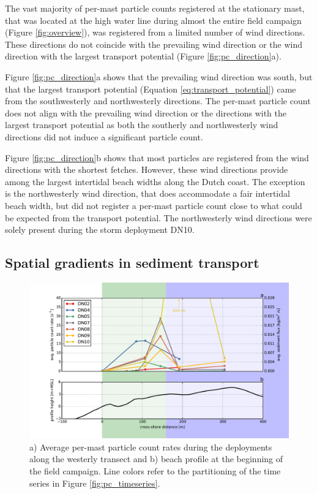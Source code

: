 The vast majority of per-mast particle counts registered at the
stationary mast, that was located at the high water line during almost
the entire field campaign (Figure \ref{fig:overview}), was registered
from a limited number of wind directions. These directions do not
coincide with the prevailing wind direction or the wind direction with
the largest transport potential (Figure \ref{fig:pc_direction}a).

Figure \ref{fig:pc_direction}a shows that the prevailing wind
direction was south, but that the largest transport potential
(Equation \ref{eq:transport_potential}) came from the southwesterly
and northwesterly directions. The per-mast particle count does not
align with the prevailing wind direction or the directions with the
largest transport potential as both the southerly and northwesterly
wind directions did not induce a significant particle count.

Figure \ref{fig:pc_direction}b shows that most particles are
registered from the wind directions with the shortest
fetches. However, these wind directions provide among the largest
intertidal beach widths along the Dutch coast.  The
exception is the northwesterly wind direction, that does accommodate a
fair intertidal beach width, but did not register a per-mast particle
count close to what could be expected from the transport
potential. The northwesterly wind directions were solely present
during the storm deployment DN10.

\subsection{Spatial gradients in sediment transport}

\begin{figure}
 \centering
  \includegraphics[width=\columnwidth]{../Figures/particlecounts_transects}
  \caption{a) Average per-mast particle count rates during the
    deployments along the westerly transect and b) beach profile at
    the beginning of the field campaign. Line colors refer to the
    partitioning of the time series in Figure
    \ref{fig:pc_timeseries}.}
  \label{fig:pc_transect}
\end{figure}

